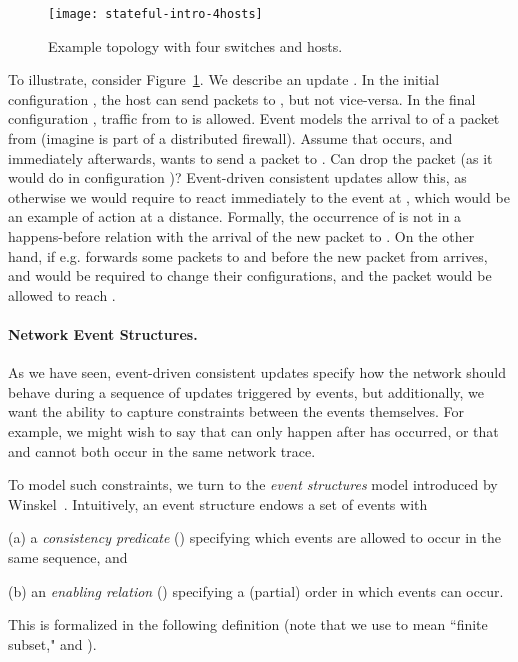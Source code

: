 \documentclass[pldi-cameraready]{sigplanconf}
\begin{document}
\begin{figure}[t]
\centering
\texttt{[image: stateful-intro-4hosts]}
\caption{Example topology with four switches and hosts.}
\label{fig:statefulIntro4nodes}
\end{figure}

To illustrate, consider Figure~\ref{fig:statefulIntro4nodes}. We
describe an update . In the initial
configuration , the host  can send packets to , but not
vice-versa. In the final configuration , traffic from  to
 is allowed. Event  models the arrival to  of a packet
from  (imagine  is part of a distributed firewall). Assume
that  occurs, and immediately afterwards,  wants to send a
packet to . Can  drop the packet (as it would do in
configuration )? Event-driven consistent updates allow this, as
otherwise we would require  to react immediately to the event at
, which would be an example of action at a distance. Formally,
the occurrence of  is not in a happens-before relation with the
arrival of the new packet to . On the other hand, if e.g. 
forwards some packets to  and  before the new packet from
 arrives,  and  would be required to change their
configurations, and the packet would be allowed to reach .



\paragraph*{Network Event Structures.}
As we have seen, event-driven consistent updates specify how the network should behave
during a sequence of updates triggered by events, but additionally, we want the ability to
capture constraints
between the events themselves. For example, we might wish to say that  can
only happen after  has occurred, or that  and  cannot
both occur in the same network trace.




To model such constraints, we turn to the {\em event structures} model
introduced by Winskel~\cite{winskel1987event}.
Intuitively, an event structure endows a set of events 
with
\begin{inparaenum}
\item[(a)] a {\em consistency predicate} () specifying which events
  are allowed to occur in the same sequence, and 
\item[(b)] an {\em enabling relation} () specifying a (partial)
  order in which events can occur. 
\end{inparaenum}
This is formalized in the following definition (note that we use  to
mean ``finite subset," and ).
\end{document}
